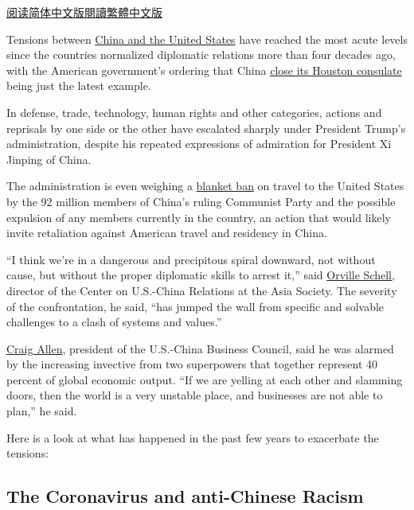 \href{https://cn.nytimes3xbfgragh.onion/usa/20200723/us-china-cold-war/}{阅读简体中文版}\href{https://cn.nytimes3xbfgragh.onion/usa/20200723/us-china-cold-war/zh-hant/}{閱讀繁體中文版}

Tensions between
\href{https://www.nytimes3xbfgragh.onion/2020/07/23/world/asia/us-china-consulate.html}{China
and the United States} have reached the most acute levels since the
countries normalized diplomatic relations more than four decades ago,
with the American government's ordering that China
\href{https://www.nytimes3xbfgragh.onion/2020/07/22/world/asia/us-china-houston-consulate.html?action=click\&module=Top\%20Stories\&pgtype=Homepage}{close
its Houston consulate} being just the latest example.

In defense, trade, technology, human rights and other categories,
actions and reprisals by one side or the other have escalated sharply
under President Trump's administration, despite his repeated expressions
of admiration for President Xi Jinping of China.

The administration is even weighing a
\href{https://www.nytimes3xbfgragh.onion/2020/07/15/us/politics/china-travel-ban.html?searchResultPosition=3}{blanket
ban} on travel to the United States by the 92 million members of China's
ruling Communist Party and the possible expulsion of any members
currently in the country, an action that would likely invite retaliation
against American travel and residency in China.

``I think we're in a dangerous and precipitous spiral downward, not
without cause, but without the proper diplomatic skills to arrest it,''
said \href{https://asiasociety.org/orville-schell}{Orville Schell},
director of the Center on U.S.-China Relations at the Asia Society. The
severity of the confrontation, he said, ``has jumped the wall from
specific and solvable challenges to a clash of systems and values.''

\href{https://www.uschina.org/craig-allen}{Craig Allen}, president of
the U.S.-China Business Council, said he was alarmed by the increasing
invective from two superpowers that together represent 40 percent of
global economic output. ``If we are yelling at each other and slamming
doors, then the world is a very unstable place, and businesses are not
able to plan,'' he said.

Here is a look at what has happened in the past few years to exacerbate
the tensions:

\hypertarget{the-coronavirus-and-anti-chinese-racism}{%
\subsection{The Coronavirus and anti-Chinese
Racism}\label{the-coronavirus-and-anti-chinese-racism}}

